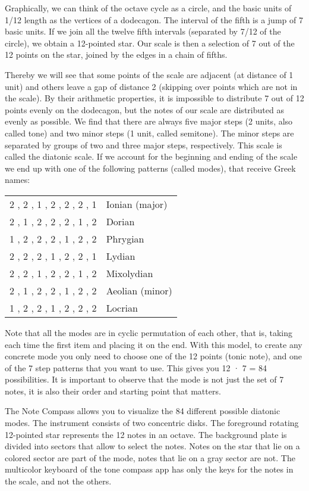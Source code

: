Graphically, we can think of the octave cycle as a circle, and the basic units of 1/12 length as the vertices of a dodecagon. The interval of the fifth is a jump of 7 basic units. If we join all the twelve fifth intervals (separated by 7/12 of the circle), we obtain a 12-pointed star. Our scale is then a selection of 7 out of the 12 points on the star, joined by the edges in a chain of fifths.

Thereby we will see that some points of the scale are adjacent (at distance of 1 unit) and others  leave  a gap of distance 2 (skipping over points which are not in the scale). By their arithmetic properties, it is impossible to distribute 7 out of  12 points evenly on the dodecagon, but the notes of our scale are distributed as evenly as possible. We find that there are always five major steps (2 units, also called tone) and two minor steps (1 unit, called semitone). The minor steps are separated by groups of two and three major steps, respectively. This scale is called the diatonic scale. If we account for the beginning and ending of the scale we end up with one of the following patterns (called modes), that receive Greek names:

\begin{center}
\begin{tabular}{rl}
	2 , 2 , 1 , 2 , 2 , 2 , 1 & Ionian (major) \\
	2 , 1 , 2 , 2 , 2 , 1 , 2 & Dorian \\
	1 , 2 , 2 , 2 , 1 , 2 , 2 & Phrygian \\
	2 , 2 , 2 , 1 , 2 , 2 , 1 & Lydian \\
	2 , 2 , 1 , 2 , 2 , 1 , 2 & Mixolydian \\
	2 , 1 , 2 , 2 , 1 , 2 , 2 & Aeolian (minor) \\
	1 , 2 , 2 , 1 , 2 , 2 , 2 & Locrian \\
\end{tabular}
\end{center}
Note that all the modes are in cyclic permutation of each other, that is, taking each time the first item and placing it on the end. With this model, to create any concrete mode you only need to choose one of the 12 points (tonic note), and one of the 7 step patterns that you want to use. This gives you 12 · 7 = 84 possibilities. It is important to observe that the mode is not just the set of 7 notes, it is also their order and starting point that matters.

The Note Compass allows you to visualize the 84 different possible diatonic modes. The instrument consists of two concentric disks. The foreground rotating 12-pointed star represents the 12 notes in an octave. The background plate is divided into sectors that allow to select the notes. Notes on the star that lie on a colored sector are part of the mode, notes that lie on a gray sector are not. The multicolor keyboard of the tone compass app has only the keys for the notes in the scale, and not the others.

